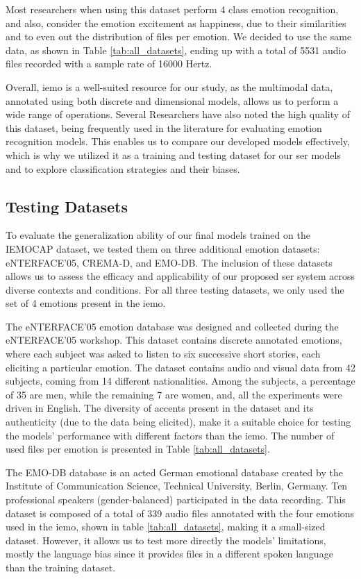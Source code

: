 Most researchers when using this dataset perform 4 class emotion recognition, and also, consider the emotion excitement as happiness, due to their similarities and to even out the distribution of files per emotion. We decided to use the same data, as shown in Table \ref{tab:all_datasets}, ending up with a total of 5531 audio files recorded with a sample rate of 16000 Hertz.

Overall, \ac{iemo} is a well-suited resource for our study, as the multimodal data, annotated using both discrete and dimensional models, allows us to perform a wide range of operations. Several Researchers have also noted the high quality of this dataset, being frequently used in the literature for evaluating emotion recognition models. This enables us to compare our developed models effectively, which is why we utilized it as a training and testing dataset for our \ac{ser} models and to explore classification strategies and their biases.

\subsection{Testing Datasets}

To evaluate the generalization ability of our final models trained on the IEMOCAP dataset, we tested them on three additional emotion datasets: eNTERFACE’05, CREMA-D, and EMO-DB. The inclusion of these datasets allows us to assess the efficacy and applicability of our proposed \ac{ser} system across diverse contexts and conditions. For all three testing datasets, we only used the set of 4 emotions present in the \ac{iemo}.

The eNTERFACE’05 emotion database \cite{Martin2006} was designed and collected during the eNTERFACE’05 workshop. This dataset contains discrete annotated emotions, where each subject was asked to listen to six successive short stories, each eliciting a particular emotion. The dataset contains audio and visual data from 42 subjects, coming from 14 different nationalities. Among the subjects, a percentage of 35 are men, while the remaining 7 are women, and, all the experiments were driven in English. The diversity of accents present in the dataset and its authenticity (due to the data being elicited), make it a suitable choice for testing the models' performance with different factors than the \ac{iemo}. The number of used files per emotion is presented in Table \ref{tab:all_datasets}.

The EMO-DB database is an acted German emotional database created by the Institute of Communication Science, Technical University, Berlin, Germany. Ten professional speakers (gender-balanced) participated in the data recording. This dataset is composed of a total of 339 audio files annotated with the four emotions used in the \ac{iemo}, shown in table \ref{tab:all_datasets}, making it a small-sized dataset. However, it allows us to test more directly the models' limitations, mostly the language bias since it provides files in a different spoken language than the training dataset. 

